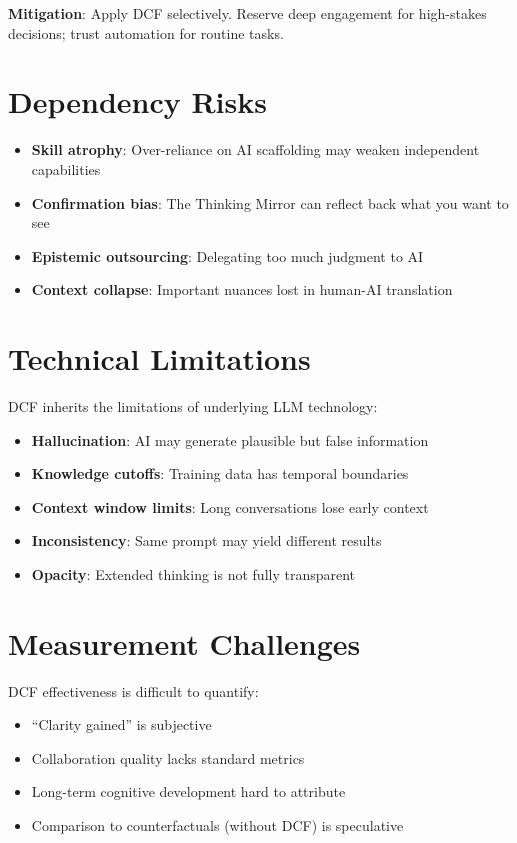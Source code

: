 \textbf{Mitigation}: Apply DCF selectively. Reserve deep engagement for high-stakes decisions; trust automation for routine tasks.

\section{Dependency Risks}

\begin{itemize}
    \item \textbf{Skill atrophy}: Over-reliance on AI scaffolding may weaken independent capabilities
    \item \textbf{Confirmation bias}: The Thinking Mirror can reflect back what you want to see
    \item \textbf{Epistemic outsourcing}: Delegating too much judgment to AI
    \item \textbf{Context collapse}: Important nuances lost in human-AI translation
\end{itemize}

\section{Technical Limitations}

DCF inherits the limitations of underlying LLM technology:

\begin{itemize}
    \item \textbf{Hallucination}: AI may generate plausible but false information
    \item \textbf{Knowledge cutoffs}: Training data has temporal boundaries
    \item \textbf{Context window limits}: Long conversations lose early context
    \item \textbf{Inconsistency}: Same prompt may yield different results
    \item \textbf{Opacity}: Extended thinking is not fully transparent
\end{itemize}

\section{Measurement Challenges}

DCF effectiveness is difficult to quantify:

\begin{itemize}
    \item ``Clarity gained'' is subjective
    \item Collaboration quality lacks standard metrics
    \item Long-term cognitive development hard to attribute
    \item Comparison to counterfactuals (without DCF) is speculative
\end{itemize}

